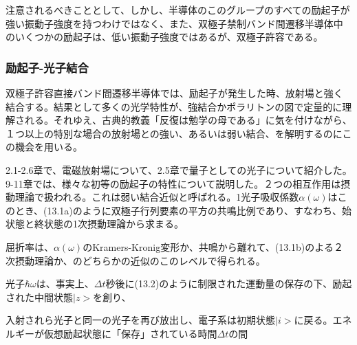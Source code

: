 \documentclass[11pt,a4j,uplatex]{jsarticle}
\begin{document}
注意されるべきこととして、しかし、半導体のこのグループのすべての励起子が強い振動子強度を持つわけではなく、また、双極子禁制バンド間遷移半導体中のいくつかの励起子は、低い振動子強度ではあるが、双極子許容である。

\subsubsection{励起子-光子結合}
双極子許容直接バンド間遷移半導体では、励起子が発生した時、放射場と強く結合する。結果として多くの光学特性が、強結合かポラリトンの図で定量的に理解される。それゆえ、古典的教義「反復は勉学の母である」に気を付けながら、１つ以上の特別な場合の放射場との強い、あるいは弱い結合、を解明するのにこの機会を用いる。

2.1-2.6章で、電磁放射場について、2.5章で量子としての光子について紹介した。9-11章では、様々な初等の励起子の特性について説明した。２つの相互作用は摂動理論で扱われる。これは弱い結合近似と呼ばれる。1光子吸収係数$\alpha(\omega)$はこのとき、(13.1a)のように双極子行列要素の平方の共鳴比例であり、すなわち、始状態と終状態の1次摂動理論から求まる。


屈折率は、$\alpha(\omega)$のKramers-Kronig変形か、共鳴から離れて、(13.1b)のよる２次摂動理論か、のどちらかの近似のこのレベルで得られる。


光子$\hbar\omega$は、事実上、$\Delta t$秒後に(13.2)のように制限された運動量の保存の下、励起された中間状態$|z>$を創り、


入射されら光子と同一の光子を再び放出し、電子系は初期状態$|i>$に戻る。エネルギーが仮想励起状態に「保存」されている時間$\Delta t$の間
\end{document}
